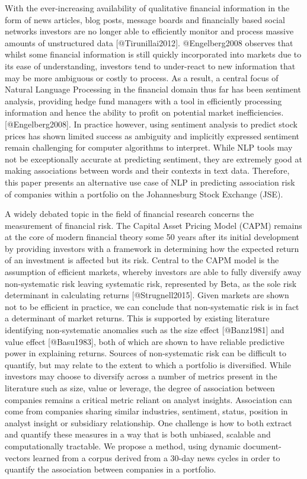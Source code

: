 \documentclass[11pt]{article}
\begin{document}
With the ever-increasing availability of qualitative financial
information in the form of news articles, blog posts, message boards and
financially based social networks investors are no longer able to
efficiently monitor and process massive amounts of unstructured data
{[}@Tirunillai2012{]}. @Engelberg2008 observes that whilst some
financial information is still quickly incorporated into markets due to
its ease of understanding, investors tend to under-react to new
information that may be more ambiguous or costly to process. As a
result, a central focus of Natural Language Processing in the financial
domain thus far has been sentiment analysis, providing hedge fund
managers with a tool in efficiently processing information and hence the
ability to profit on potential market inefficiencies.
{[}@Engelberg2008{]}. In practice however, using sentiment analysis to
predict stock prices has shown limited success as ambiguity and
implicitly expressed sentiment remain challenging for computer
algorithms to interpret. While NLP tools may not be exceptionally
accurate at predicting sentiment, they are extremely good at making
associations between words and their contexts in text data. Therefore,
this paper presents an alternative use case of NLP in predicting
association risk of companies within a portfolio on the Johannesburg
Stock Exchange (JSE).

A widely debated topic in the field of financial research concerns the
measurement of financial risk. The Capital Asset Pricing Model (CAPM)
remains at the core of modern financial theory some 50 years after its
initial development by providing investors with a framework in
determining how the expected return of an investment is affected but its
risk. Central to the CAPM model is the assumption of efficient markets,
whereby investors are able to fully diversify away non-systematic risk
leaving systematic risk, represented by Beta, as the sole risk
determinant in calculating returns {[}@Strugnell2015{]}. Given markets
are shown not to be efficient in practice, we can conclude that
non-systematic risk is in fact a determinant of market returns. This is
supported by existing literature identifying non-systematic anomalies
such as the size effect {[}@Banz1981{]} and value effect
{[}@Basu1983{]}, both of which are shown to have reliable predictive
power in explaining returns. Sources of non-systematic risk can be
difficult to quantify, but may relate to the extent to which a portfolio
is diversified. While investors may choose to diversify across a number
of metrics present in the literature such as size, value or leverage,
the degree of association between companies remains a critical metric
reliant on analyst insights. Association can come from companies sharing
similar industries, sentiment, status, position in analyst insight or
subsidiary relationship. One challenge is how to both extract and
quantify these measures in a way that is both unbiased, scalable and
computationally tractable. We propose a method, using dynamic
document-vectors learned from a corpus derived from a 30-day news cycles
in order to quantify the association between companies in a portfolio.
\end{document}

